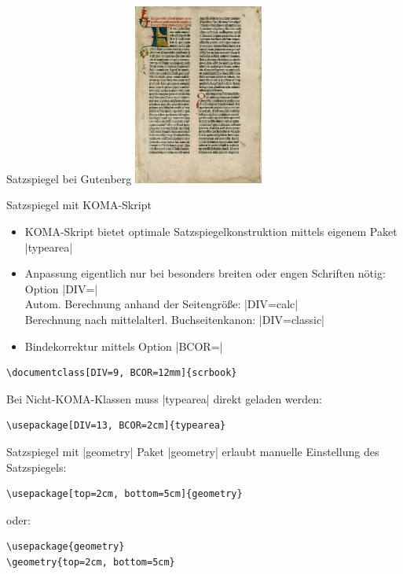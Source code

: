\documentclass[
	vorläufig=true,
	datum=2016-10-28,
	titel={Allgemeine Formatierung und Pakete},
	web=true,
]{../tex/latexkurs-slides}
\begin{document}
\begin{frame}{Satzspiegel bei Gutenberg}
	\hspace{5.4cm}\includegraphics[height=5.95cm]{01_gutenbergbibel}
\end{frame}

\begin{frame}[fragile]{Satzspiegel mit KOMA-Skript}
\vspace{-2em}
\begin{itemize}
	\item KOMA-Skript bietet optimale Satzspiegelkonstruktion mittels eigenem Paket |typearea|
	\item Anpassung eigentlich nur bei besonders breiten oder engen Schriften nötig: Option |DIV=|
	\\Autom. Berechnung anhand der Seitengröße: |DIV=calc| 
	\\Berechnung nach mittelalterl. Buchseitenkanon: |DIV=classic|
	\item Bindekorrektur mittels Option |BCOR=|
\end{itemize}
\begin{lstlisting}
\documentclass[DIV=9, BCOR=12mm]{scrbook}	
\end{lstlisting}
\vfill
\begin{olcol}
Bei Nicht-KOMA-Klassen muss |typearea| direkt geladen werden:
\begin{lstlisting}
\usepackage[DIV=13, BCOR=2cm]{typearea}
\end{lstlisting}
\end{olcol}
\end{frame}

\begin{frame}[fragile]{Satzspiegel mit |geometry|}%
Paket |geometry|  erlaubt manuelle Einstellung des Satzspiegels:
\begin{lstlisting}
\usepackage[top=2cm, bottom=5cm]{geometry}
\end{lstlisting}
oder:
\begin{lstlisting}
\usepackage{geometry}
\geometry{top=2cm, bottom=5cm}
\end{lstlisting}
\end{frame}
\end{document}
